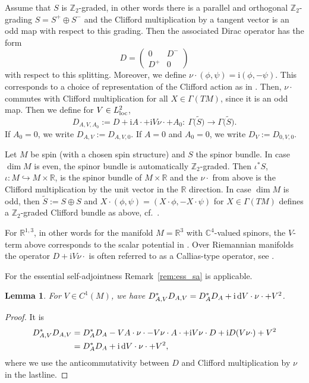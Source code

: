 \documentclass[10pt,a4paper]{amsart}
\numberwithin{equation}{section}
\newtheorem{Lemma}[Theorem]{Lemma}
\begin{document}
Assume that $S$ is $\mathbb Z_2$-graded, in other words there is a parallel and orthogonal $\mathbb Z_2$-grading $S=S^+\oplus S^-$ and the Clifford multiplication by a tangent vector is an odd map with respect to this grading. Then the associated Dirac operator has the form
\[ D= \begin{pmatrix} 0 & D^-\\ D^+ & 0
\end{pmatrix}\]
with respect to this splitting. Moreover, we define $\nu\cdot (\phi,\psi)= {\mathrm{i}}  (\phi, -\psi)$. This corresponds to a choice of representation of the Clifford action as in \cite{Ginoux,Thaller}. Then, $\nu\cdot$ commutes with Clifford multiplication for all $X\in \Gamma(TM)$, since it is an odd map. Then we define for $V\in L^2_{\rm{loc}}$,
\[ D_{A,V, A_0}:= D+ \mathrm{i} A\cdot + {\mathrm{i}}V \nu\cdot + A_0\colon \ \Gamma\bigl(\tilde{S}\bigr)\to \Gamma\bigl(\tilde{S}\bigr).\]
If $A_0=0$, we write $D_{A,V}:= D_{A,V,0}$. If $A=0$ and $A_0=0$, we write $D_V:= D_{0,V,0}$.
\begin{Remark}
Let $M$ be spin (with a chosen spin structure) and $S$ the spinor bundle. In case $\dim M$ is even, the spinor bundle is automatically $\mathbb Z_2$-graded. Then $\iota^*S$, $\iota\colon M\hookrightarrow M\times {\mathbb R}$, is the spinor bundle of $M\times {\mathbb R}$ and the $\nu\cdot $ from above is the Clifford multiplication by the unit vector in the ${\mathbb R}$ direction. In case $\dim M$ is odd, then $\tilde{S}:= S\oplus S$ and $X\cdot (\phi, \psi) = (X\cdot \phi, -X\cdot \psi)$ for $X\in \Gamma(TM)$ defines a $\mathbb Z_2$-graded Clifford bundle as above, cf.\ \cite[Section~1.4]{Ginoux}.
\end{Remark} 	
For ${\mathbb R}^{1,3}$, in other words for the manifold $M={\mathbb R}^3$ with ${\mathbb C}^4$-valued spinors, the $V$-term above corresponds to the scalar potential in \cite[Section~4.2.1]{Thaller}.
Over Riemannian manifolds the operator $D+{\mathrm{i}}V \nu\cdot$ is often referred to as a Callias-type operator, see \cite{CZ}.

For the essential self-adjointness Remark~\ref{rem:ess_sa} is applicable.
\begin{Lemma} \label{DAV_square}For $V\in C^1(M)$, we have $D_{A,V}^*D_{A,V}= D_A^*D_A + {\mathrm{i}}\,  {\rm d}V\cdot \nu\cdot +V^2$.
\end{Lemma}
\begin{proof}It is
\begin{align*}
D_{A,V}^*D_{A,V} &=D_A^*D_A - V A\cdot \nu\cdot -V\nu\cdot A\cdot +{\mathrm{i}}V\nu\cdot D +{\mathrm{i}}  D(V\nu\cdot ) +V^2 \\
& =D_A^*D_A + {\mathrm{i}}\,  {\rm d}V\cdot \nu\cdot +V^2,
\end{align*}
where we use the anticommutativity between $D$ and Clifford multiplication by $\nu$ in the last\linebreak line.\end{proof}
\end{document}
